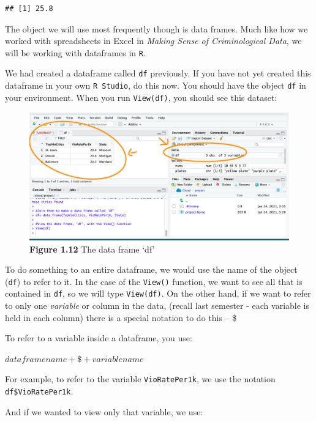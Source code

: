 \documentclass[
]{book}
\newenvironment{Shaded}{\begin{snugshade}}{\end{snugshade}}
\newcommand{\FunctionTok}[1]{\textcolor[rgb]{0.00,0.00,0.00}{#1}}
\newcommand{\NormalTok}[1]{#1}
\newcommand{\SpecialCharTok}[1]{\textcolor[rgb]{0.00,0.00,0.00}{#1}}
\begin{document}
\begin{verbatim}
## [1] 25.8
\end{verbatim}

The object we will use most frequently though is data frames. Much like how we worked with spreadsheets in Excel in \emph{Making Sense of Criminological Data}, we will be working with dataframes in \texttt{R}.

We had created a dataframe called \texttt{df} previously. If you have not yet created this dataframe in your own \texttt{R\ Studio}, do this now. You should have the object \texttt{df} in your environment. When you run \texttt{View(df)}, you should see this dataset:

\begin{figure}
\centering
\includegraphics{Images/df_view.png}
\caption{\textbf{Figure 1.12} The data frame `df'}
\end{figure}

To do something to an entire dataframe, we would use the name of the object (\texttt{df}) to refer to it. In the case of the \texttt{View()} function, we want to see all that is contained in \texttt{df}, so we will type \texttt{View(df)}. On the other hand, if we want to refer to only one \emph{variable} or column in the data, (recall last semester - each variable is held in each column) there is a special notation to do this -- \$

To refer to a variable inside a dataframe, you use:

\(dataframe name + \$ + variable name\)

For example, to refer to the variable \texttt{VioRatePer1k}, we use the notation \texttt{df\$VioRatePer1k}.

And if we wanted to view only that variable, we use:

\begin{Shaded}
\end{Shaded}
\end{document}
